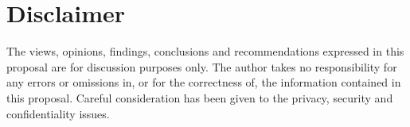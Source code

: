 \section*{Disclaimer}
\label{s:disclaimer}
The views, opinions, findings, conclusions and recommendations expressed in this proposal are for discussion purposes only. The author takes no responsibility for any errors or omissions in, or for the correctness of, the information contained in this proposal. Careful consideration has been given to the privacy, security and confidentiality issues.
\newpage
\tableofcontents
\newpage
